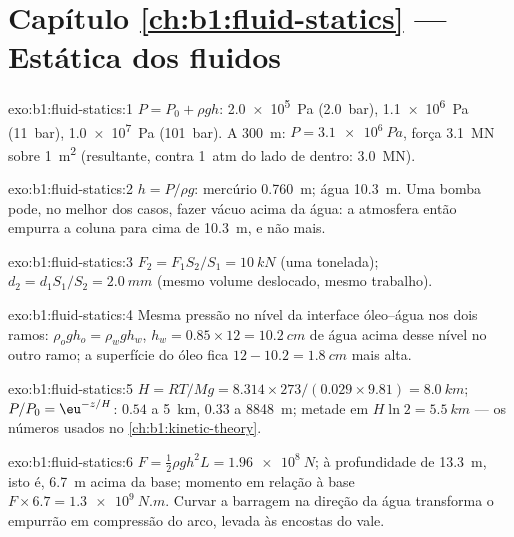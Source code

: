 \section*{Capítulo \ref{ch:b1:fluid-statics} --- Estática dos fluidos}

\begin{solution}{exo:b1:fluid-statics:1}
$P = P_0 + \rho gh$: \qty{2.0e5}{Pa} (\qty{2.0}{bar}), \qty{1.1e6}{Pa}
(\qty{11}{bar}), \qty{1.0e7}{Pa} (\qty{101}{bar}). A \qty{300}{m}: $P =
\qty{3.1e6}{Pa}$, força \qty{3.1}{MN} sobre \qty{1}{m^2} (resultante, contra
\qty{1}{atm} do lado de dentro: \qty{3.0}{MN}).
\end{solution}

\begin{solution}{exo:b1:fluid-statics:2}
$h = P/\rho g$: mercúrio \qty{0.760}{m}; água \qty{10.3}{m}. Uma bomba pode,
no melhor dos casos, fazer vácuo acima da água: a atmosfera então empurra a
coluna para cima de \qty{10.3}{m}, e não mais.
\end{solution}

\begin{solution}{exo:b1:fluid-statics:3}
$F_2 = F_1S_2/S_1 = \qty{10}{kN}$ (uma tonelada); $d_2 = d_1S_1/S_2 = \qty{2.0}{mm}$
(mesmo volume deslocado, mesmo trabalho).
\end{solution}

\begin{solution}{exo:b1:fluid-statics:4}
Mesma pressão no nível da interface óleo--água nos dois ramos: $\rho_og
h_o = \rho_wgh_w$, $h_w = 0.85 \times 12 = \qty{10.2}{cm}$ de água acima
desse nível no outro ramo; a superfície do óleo fica $12 - 10.2 = \qty{1.8}{cm}$
mais alta.
\end{solution}

\begin{solution}{exo:b1:fluid-statics:5}
$H = RT/Mg = 8.314 \times 273/(0.029 \times 9.81) = \qty{8.0}{km}$; $P/P_0 =
\eu^{-z/H}$: $0.54$ a \qty{5}{km}, $0.33$ a \qty{8848}{m}; metade em $H\ln2 =
\qty{5.5}{km}$ --- os números usados no \cref{ch:b1:kinetic-theory}.
\end{solution}

\begin{solution}{exo:b1:fluid-statics:6}
$F = \tfrac12\rho gh^2L = \qty{1.96e8}{N}$;  à profundidade de \qty{13.3}{m},
isto é, \qty{6.7}{m} acima da base; momento em relação à base $F \times
6.7 = \qty{1.3e9}{N.m}$. Curvar a barragem na direção da água transforma o empurrão
em compressão do arco, levada às encostas do vale.
\end{solution}

